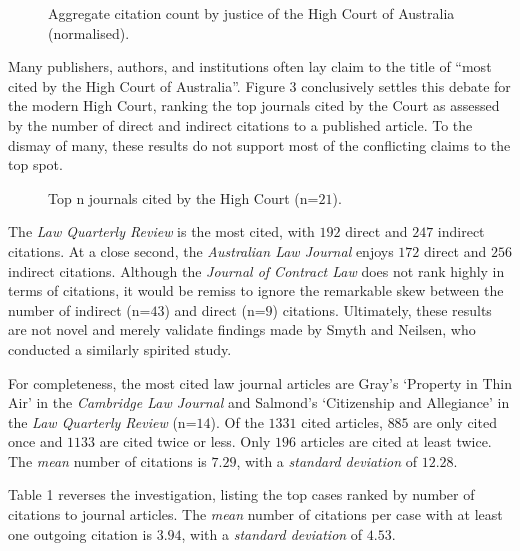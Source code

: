 \begin{figure}[!htpb]
    \centering
    
    \caption{Aggregate citation count by justice of the High Court of Australia (normalised).}
\end{figure}

Many publishers, authors, and institutions often lay claim to the title of ``most cited by the High Court of Australia''. Figure 3 conclusively settles this debate for the modern High Court, ranking the top journals cited by the Court as assessed by the number of direct and indirect citations to a published article. To the dismay of many, these results do not support most of the conflicting claims to the top spot.


\begin{figure}[!htpb]
    \centering
    \makebox[\textwidth][c]{}
    \caption{Top n journals cited by the High Court (n=$21$).}
\end{figure}

The \emph{Law Quarterly Review} is the most cited, with $192$ direct and $247$ indirect citations. At a close second, the \emph{Australian Law Journal} enjoys $172$ direct and $256$ indirect citations. Although the \emph{Journal of Contract Law} does not rank highly in terms of citations, it would be remiss to ignore the remarkable skew between the number of indirect (n=$43$) and direct (n=$9$) citations. Ultimately, these results are not novel and merely validate findings made by Smyth and Neilsen, who conducted a similarly spirited study.

For completeness, the most cited law journal articles are Gray's `Property in Thin Air' in the \textit{Cambridge Law Journal} and Salmond's `Citizenship and Allegiance' in the \textit{Law Quarterly Review} (n=$14$). Of the $1331$ cited articles, $885$ are only cited once and $1133$ are cited twice or less. Only $196$ articles are cited at least twice. The \emph{mean} number of citations is $7.29$, with a \emph{standard deviation} of $12.28$.

Table 1 reverses the investigation, listing the top cases ranked by number of citations to journal articles. The \emph{mean} number of citations per case with at least one outgoing citation is $3.94$, with a \emph{standard deviation} of $4.53$. 

